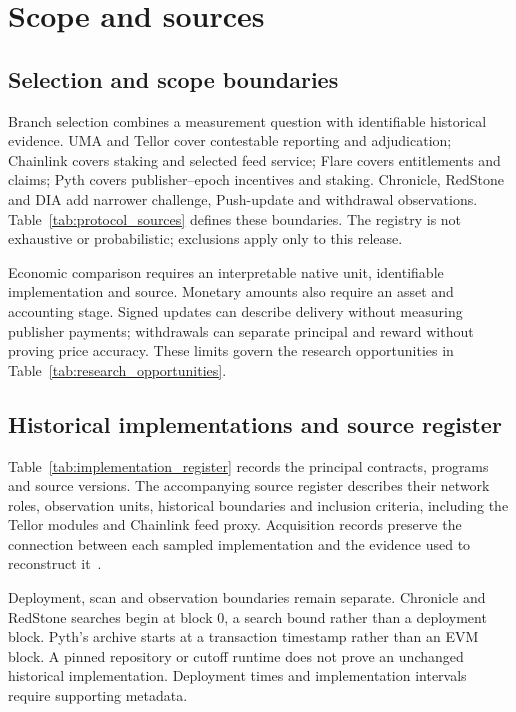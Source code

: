 \section{Scope and sources}
\label{app:scope}

\subsection{Selection and scope boundaries}
Branch selection combines a measurement question with identifiable historical evidence. UMA and Tellor cover contestable reporting and adjudication; Chainlink covers staking and selected feed service; Flare covers entitlements and claims; Pyth covers publisher--epoch incentives and staking. Chronicle, RedStone and DIA add narrower challenge, Push-update and withdrawal observations. Table~\ref{tab:protocol_sources} defines these boundaries. The registry is not exhaustive or probabilistic; exclusions apply only to this release.

Economic comparison requires an interpretable native unit, identifiable implementation and source. Monetary amounts also require an asset and accounting stage. Signed updates can describe delivery without measuring publisher payments; withdrawals can separate principal and reward without proving price accuracy. These limits govern the research opportunities in Table~\ref{tab:research_opportunities}.

\subsection{Historical implementations and source register}
\label{app:implementations}
Table~\ref{tab:implementation_register} records the principal contracts, programs and source versions. The accompanying source register describes their network roles, observation units, historical boundaries and inclusion criteria, including the Tellor modules and Chainlink feed proxy. Acquisition records preserve the connection between each sampled implementation and the evidence used to reconstruct it~\cite{atlasScopeMetadata2026}.

Deployment, scan and observation boundaries remain separate. Chronicle and RedStone searches begin at block 0, a search bound rather than a deployment block. Pyth's archive starts at a transaction timestamp rather than an EVM block. A pinned repository or cutoff runtime does not prove an unchanged historical implementation. Deployment times and implementation intervals require supporting metadata.

